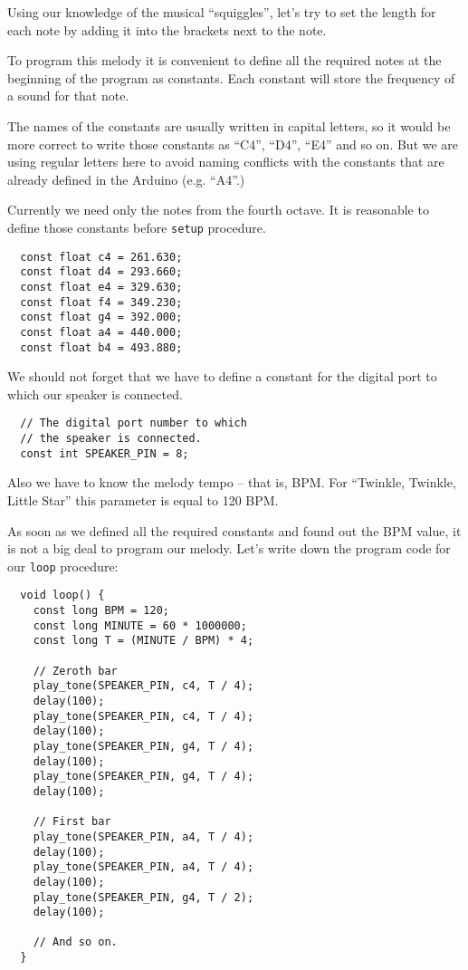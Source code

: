 \documentclass[../sparc.tex]{subfiles}
\begin{document}
Using our knowledge of the musical ``squiggles'', let's try to set the length
for each note by adding it into the brackets next to the note.


To program this melody it is convenient to define all the required notes at the
beginning of the program as constants.  Each constant will store the frequency
of a sound for that note.

The names of the constants are usually written in capital letters, so it would
be more correct to write those constants as ``C4'', ``D4'', ``E4'' and so on.
But we are using regular letters here to avoid naming conflicts with the
constants that are already defined in the Arduino (e.g. ``A4''.)

Currently we need only the notes from the fourth octave.  It is reasonable to
define those constants before \texttt{setup} procedure.

\begin{verbatim}
  const float c4 = 261.630;
  const float d4 = 293.660;
  const float e4 = 329.630;
  const float f4 = 349.230;
  const float g4 = 392.000;
  const float a4 = 440.000;
  const float b4 = 493.880;
\end{verbatim}

We should not forget that we have to define a constant for the digital port to
which our speaker is connected.

\begin{verbatim}
  // The digital port number to which
  // the speaker is connected.
  const int SPEAKER_PIN = 8;
\end{verbatim}

Also we have to know the melody tempo -- that is, \gls{BPM}.  For ``Twinkle,
Twinkle, Little Star'' this parameter is equal to 120 BPM.

As soon as we defined all the required constants and found out the BPM value, it
is not a big deal to program our melody.  Let's write down the program code for
our \texttt{loop} procedure:

\begin{verbatim}
  void loop() {
    const long BPM = 120;
    const long MINUTE = 60 * 1000000;
    const long T = (MINUTE / BPM) * 4;

    // Zeroth bar
    play_tone(SPEAKER_PIN, c4, T / 4);
    delay(100);
    play_tone(SPEAKER_PIN, c4, T / 4);
    delay(100);
    play_tone(SPEAKER_PIN, g4, T / 4);
    delay(100);
    play_tone(SPEAKER_PIN, g4, T / 4);
    delay(100);

    // First bar
    play_tone(SPEAKER_PIN, a4, T / 4);
    delay(100);
    play_tone(SPEAKER_PIN, a4, T / 4);
    delay(100);
    play_tone(SPEAKER_PIN, g4, T / 2);
    delay(100);

    // And so on.
  }
\end{verbatim}
\end{document}
